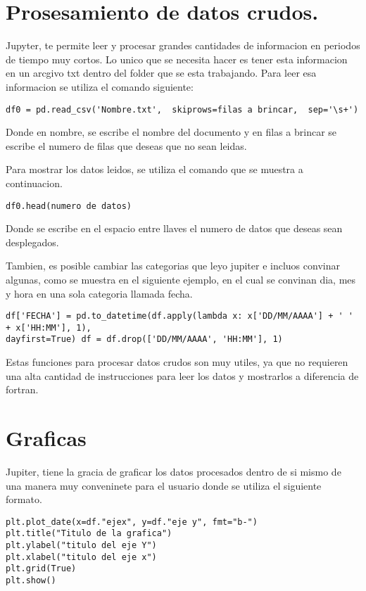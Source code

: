 \documentclass[11pt]{article}
\begin{document}
\section{Prosesamiento de datos crudos.}

Jupyter, te permite leer y procesar  grandes cantidades de informacion en periodos de tiempo muy cortos. Lo unico que se necesita hacer es tener esta informacion en un arcgivo txt dentro del folder que se esta trabajando. Para leer esa informacion se utiliza el comando siguiente: 
\begin{verbatim}
df0 = pd.read_csv('Nombre.txt',  skiprows=filas a brincar,  sep='\s+')
\end{verbatim}
Donde en nombre, se escribe el nombre del documento y en filas a brincar se escribe el numero de filas que deseas que no sean leidas.
\linebreak

Para mostrar los datos leidos, se utiliza el comando que se muestra a continuacion.
\begin{verbatim}
df0.head(numero de datos)
\end{verbatim}
Donde se escribe en el espacio entre llaves el numero de datos que deseas sean desplegados.
\linebreak

Tambien, es posible cambiar las categorias que leyo jupiter e incluos convinar algunas, como se muestra en el siguiente ejemplo, en el cual se convinan dia, mes y hora en una sola categoria llamada fecha.

\begin{verbatim}
df['FECHA'] = pd.to_datetime(df.apply(lambda x: x['DD/MM/AAAA'] + ' ' + x['HH:MM'], 1), 
dayfirst=True) df = df.drop(['DD/MM/AAAA', 'HH:MM'], 1)

\end{verbatim}

Estas funciones para procesar datos crudos son muy utiles, ya que no requieren una alta cantidad de instrucciones para leer los datos y mostrarlos a diferencia de fortran.

\section{Graficas}

Jupiter, tiene la gracia de graficar los datos procesados dentro de si mismo de una manera muy conveninete para el usuario donde se utiliza el siguiente formato. 

\begin{verbatim}
plt.plot_date(x=df."ejex", y=df."eje y", fmt="b-")
plt.title("Titulo de la grafica")
plt.ylabel("titulo del eje Y")
plt.xlabel("titulo del eje x")
plt.grid(True)
plt.show()
\end{verbatim}
\end{document}
